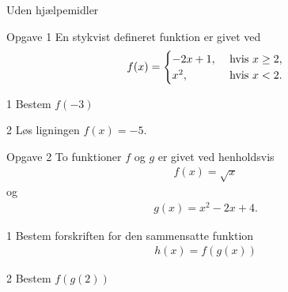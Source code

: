 \documentclass[12pt,x11names,a4paper]{article}
\begin{document}
\newpage

\begin{center}
	\LARGE Uden hjælpemidler
\end{center}
\begin{opgavetekst}{Opgave 1}
	En stykvist defineret funktion er givet ved
	\begin{align*}
		f(x) = \begin{cases}
			-2x + 1, &\textnormal{ hvis } x \geq 2,\\
			x^2, &\textnormal{ hvis } x < 2.
		\end{cases}
	\end{align*}
\end{opgavetekst}
\begin{delopgave}{}{1}
	Bestem $f(-3)$
\end{delopgave}
\begin{delopgave}{}{2}
	Løs ligningen $f(x) = -5$.
\end{delopgave}
\begin{opgavetekst}{Opgave 2}
	To funktioner $f$ og $g$ er givet ved henholdsvis
	\begin{align*}
		f(x) = \sqrt{x}
	\end{align*}
	og
	\begin{align*}
		g(x) = x^2-2x+4.
	\end{align*}
\end{opgavetekst}
\begin{delopgave}{}{1}
	Bestem forskriften for den sammensatte funktion
	\begin{align*}
		h(x) = f(g(x))
	\end{align*}
\end{delopgave}
\begin{delopgave}{}{2}
	Bestem $f(g(2))$
\end{delopgave}
\end{document}
